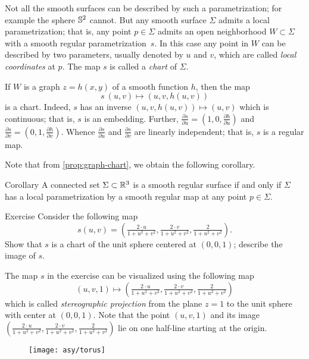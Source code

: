 Not all the smooth surfaces can be described by such a parametrization;
for example the sphere $\mathbb{S}^2$ cannot.
But any smooth surface $\Sigma$ admits a local parametrization; that is, any point $p\in\Sigma$ admits an open neighborhood $W\subset \Sigma$ with a smooth regular parametrization~$s$.
In this case any point in $W$ can be described by two parameters, usually denoted by $u$ and $v$, 
which are called \emph{local coordinates} at $p$.
The map $s$ is called a \emph{chart} of $\Sigma$.

If $W$ is a graph $z=h(x,y)$ of a smooth function $h$, then the map 
\[s\:(u,v)\mapsto (u,v,h(u,v))\] is a chart.
Indeed, $s$ has an inverse $(u,v,h(u,v))\mapsto (u,v)$ which is continuous;
that is, $s$ is an embedding.
Further,
$\tfrac{\partial s}{\partial u}=(1,0,\tfrac{\partial h}{\partial u})$ and $\tfrac{\partial s}{\partial v}=(0,1,\tfrac{\partial h}{\partial v})$. 
Whence $\tfrac{\partial s}{\partial u}$ and $\tfrac{\partial s}{\partial v}$ are linearly independent;
that is, $s$ is a regular map.

Note that from \ref{prop:graph-chart}, we obtain the following corollary.

\begin{thm}{Corollary}\label{cor:reg-parmeterization}
A connected set $\Sigma\subset \mathbb{R}^3$ is a smooth regular surface if and only if $\Sigma$ has a local parametrization by a smooth regular map at any point $p\in\Sigma$.
\end{thm}


\begin{thm}{Exercise}\label{ex:inversion-chart}
Consider the following map 
\[s(u,v)=(\tfrac{2\cdot u}{1+u^2+v^2},\tfrac{2\cdot v}{1+u^2+v^2},\tfrac{2}{1+u^2+v^2}).\]
Show that $s$ is a chart of the unit sphere centered at $(0,0,1)$; describe the image of $s$.
\end{thm}

The map $s$ in the exercise can be visualized using the following map
\[(u,v,1)\mapsto (\tfrac{2\cdot u}{1+u^2+v^2},\tfrac{2\cdot v}{1+u^2+v^2},\tfrac{2}{1+u^2+v^2})\]
which is called \emph{stereographic projection} from the plane $z=1$ to the unit sphere with center at $(0,0,1)$.
Note that the point $(u,v,1)$ and its image $(\tfrac{2\cdot u}{1+u^2+v^2},\tfrac{2\cdot v}{1+u^2+v^2},\tfrac{2}{1+u^2+v^2})$ lie on one half-line starting at the origin. %

\begin{wrapfigure}{o}{31 mm}
\vskip-0mm
\centering
\texttt{[image: asy/torus]}
\vskip-0mm
\end{wrapfigure}

